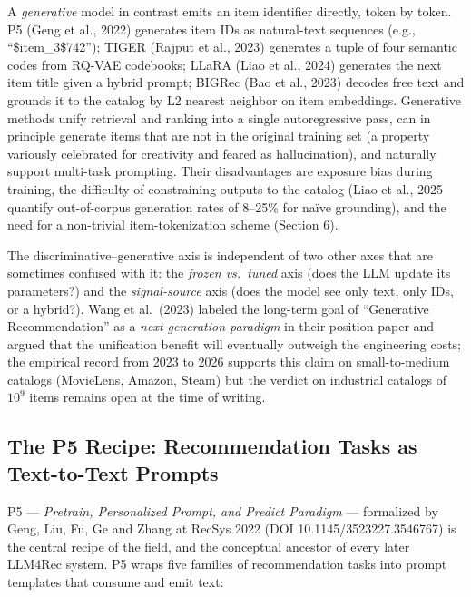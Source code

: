 A \emph{generative} model in contrast emits an item identifier directly, token by token. P5 (Geng et al., 2022) generates item IDs as natural-text sequences (e.g., ``\$item\_3\$742''); TIGER (Rajput et al., 2023) generates a tuple of four semantic codes from RQ-VAE codebooks; LLaRA (Liao et al., 2024) generates the next item title given a hybrid prompt; BIGRec (Bao et al., 2023) decodes free text and grounds it to the catalog by L2 nearest neighbor on item embeddings. Generative methods unify retrieval and ranking into a single autoregressive pass, can in principle generate items that are not in the original training set (a property variously celebrated for creativity and feared as hallucination), and naturally support multi-task prompting. Their disadvantages are exposure bias during training, the difficulty of constraining outputs to the catalog (Liao et al., 2025 quantify out-of-corpus generation rates of 8--25\% for naïve grounding), and the need for a non-trivial item-tokenization scheme (Section 6).

The discriminative--generative axis is independent of two other axes that are sometimes confused with it: the \emph{frozen vs.~tuned} axis (does the LLM update its parameters?) and the \emph{signal-source} axis (does the model see only text, only IDs, or a hybrid?). Wang et al.~(2023) labeled the long-term goal of ``Generative Recommendation'' as a \emph{next-generation paradigm} in their position paper and argued that the unification benefit will eventually outweigh the engineering costs; the empirical record from 2023 to 2026 supports this claim on small-to-medium catalogs (MovieLens, Amazon, Steam) but the verdict on industrial catalogs of \(10^9\) items remains open at the time of writing.

\subsection{The P5 Recipe: Recommendation Tasks as Text-to-Text Prompts}\label{the-p5-recipe-recommendation-tasks-as-text-to-text-prompts}

P5 --- \emph{Pretrain, Personalized Prompt, and Predict Paradigm} --- formalized by Geng, Liu, Fu, Ge and Zhang at RecSys 2022 (DOI 10.1145/3523227.3546767) is the central recipe of the field, and the conceptual ancestor of every later LLM4Rec system. P5 wraps five families of recommendation tasks into prompt templates that consume and emit text:

